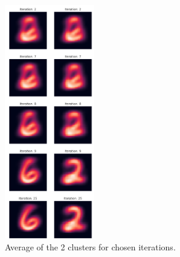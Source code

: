 \documentclass[twoside,10pt]{article}
\begin{document}
\begin{enumerate}
\begin{enumerate}
 \begin{figure}[h]
\caption{Average of the 2 clusters for chosen iterations.}
\centering
\includegraphics[width=0.35\textwidth]{2_c.png}
\end{figure}

\end{enumerate}

\end{enumerate}
\end{document}
